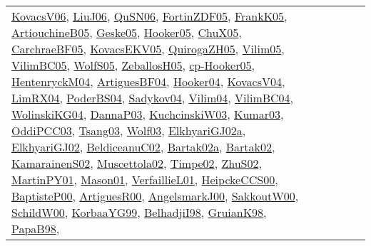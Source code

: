 {\begin{longtable}{lp{3cm}>{\raggedright}p{6cm}>{\raggedright}p{6cm}p{8cm}}
\href{papers/KovacsV06.pdf}{KovacsV06}\cite{KovacsV06}, \href{papers/LiuJ06.pdf}{LiuJ06}\cite{LiuJ06}, \href{papers/QuSN06.pdf}{QuSN06}\cite{QuSN06}, \href{papers/FortinZDF05.pdf}{FortinZDF05}\cite{FortinZDF05}, \href{papers/FrankK05.pdf}{FrankK05}\cite{FrankK05}, \href{papers/ArtiouchineB05.pdf}{ArtiouchineB05}\cite{ArtiouchineB05}, \href{papers/Geske05.pdf}{Geske05}\cite{Geske05}, \href{articles/Hooker05.pdf}{Hooker05}\cite{Hooker05}, \href{papers/ChuX05.pdf}{ChuX05}\cite{ChuX05}, \href{papers/CarchraeBF05.pdf}{CarchraeBF05}\cite{CarchraeBF05}, \href{papers/KovacsEKV05.pdf}{KovacsEKV05}\cite{KovacsEKV05}, \href{papers/QuirogaZH05.pdf}{QuirogaZH05}\cite{QuirogaZH05}, \href{papers/Vilim05.pdf}{Vilim05}\cite{Vilim05}, \href{articles/VilimBC05.pdf}{VilimBC05}\cite{VilimBC05}, \href{papers/WolfS05.pdf}{WolfS05}\cite{WolfS05}, \href{articles/ZeballosH05.pdf}{ZeballosH05}\cite{ZeballosH05}, \href{papers/cp-Hooker05.pdf}{cp-Hooker05}\cite{cp-Hooker05}, \href{papers/HentenryckM04.pdf}{HentenryckM04}\cite{HentenryckM04}, \href{papers/ArtiguesBF04.pdf}{ArtiguesBF04}\cite{ArtiguesBF04}, \href{papers/Hooker04.pdf}{Hooker04}\cite{Hooker04}, \href{papers/KovacsV04.pdf}{KovacsV04}\cite{KovacsV04}, \href{papers/LimRX04.pdf}{LimRX04}\cite{LimRX04}, \href{articles/PoderBS04.pdf}{PoderBS04}\cite{PoderBS04}, \href{papers/Sadykov04.pdf}{Sadykov04}\cite{Sadykov04}, \href{papers/Vilim04.pdf}{Vilim04}\cite{Vilim04}, \href{papers/VilimBC04.pdf}{VilimBC04}\cite{VilimBC04}, \href{papers/WolinskiKG04.pdf}{WolinskiKG04}\cite{WolinskiKG04}, \href{papers/DannaP03.pdf}{DannaP03}\cite{DannaP03}, \href{articles/KuchcinskiW03.pdf}{KuchcinskiW03}\cite{KuchcinskiW03}, \href{papers/Kumar03.pdf}{Kumar03}\cite{Kumar03}, \href{papers/OddiPCC03.pdf}{OddiPCC03}\cite{OddiPCC03}, \href{articles/Tsang03.pdf}{Tsang03}\cite{Tsang03}, \href{papers/Wolf03.pdf}{Wolf03}\cite{Wolf03}, \href{papers/ElkhyariGJ02a.pdf}{ElkhyariGJ02a}\cite{ElkhyariGJ02a}, \href{papers/ElkhyariGJ02.pdf}{ElkhyariGJ02}\cite{ElkhyariGJ02}, \href{papers/BeldiceanuC02.pdf}{BeldiceanuC02}\cite{BeldiceanuC02}, \href{papers/Bartak02a.pdf}{Bartak02a}\cite{Bartak02a}, \href{papers/Bartak02.pdf}{Bartak02}\cite{Bartak02}, \href{papers/KamarainenS02.pdf}{KamarainenS02}\cite{KamarainenS02}, \href{papers/Muscettola02.pdf}{Muscettola02}\cite{Muscettola02}, \href{articles/Timpe02.pdf}{Timpe02}\cite{Timpe02}, \href{papers/ZhuS02.pdf}{ZhuS02}\cite{ZhuS02}, \href{articles/MartinPY01.pdf}{MartinPY01}\cite{MartinPY01}, \href{articles/Mason01.pdf}{Mason01}\cite{Mason01}, \href{papers/VerfaillieL01.pdf}{VerfaillieL01}\cite{VerfaillieL01}, \href{articles/HeipckeCCS00.pdf}{HeipckeCCS00}\cite{HeipckeCCS00}, \href{articles/BaptisteP00.pdf}{BaptisteP00}\cite{BaptisteP00}, \href{articles/ArtiguesR00.pdf}{ArtiguesR00}\cite{ArtiguesR00}, \href{papers/AngelsmarkJ00.pdf}{AngelsmarkJ00}\cite{AngelsmarkJ00}, \href{articles/SakkoutW00.pdf}{SakkoutW00}\cite{SakkoutW00}, \href{articles/SchildW00.pdf}{SchildW00}\cite{SchildW00}, \href{papers/KorbaaYG99.pdf}{KorbaaYG99}\cite{KorbaaYG99}, \href{articles/BelhadjiI98.pdf}{BelhadjiI98}\cite{BelhadjiI98}, \href{papers/GruianK98.pdf}{GruianK98}\cite{GruianK98}, \href{articles/PapaB98.pdf}{PapaB98}\cite{PapaB98}, 
\end{longtable}}
